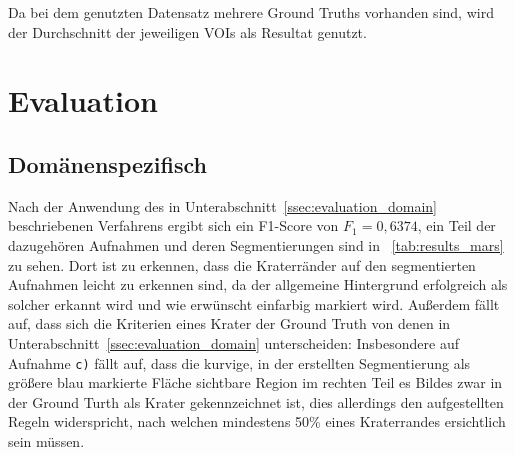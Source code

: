 Da bei dem genutzten Datensatz mehrere Ground Truths vorhanden sind, wird der Durchschnitt der jeweiligen VOIs als Resultat genutzt.



\section{Evaluation}
\label{sec:evaluation}

\subsection{Domänenspezifisch}
\label{ssec:results_domain}

Nach der Anwendung des in Unterabschnitt~\ref{ssec:evaluation_domain} beschriebenen Verfahrens ergibt sich ein F1-Score von $F_1=0,6374$, ein Teil der dazugehören Aufnahmen und deren Segmentierungen sind in \tablename~\ref{tab:results_mars} zu sehen.
Dort ist zu erkennen, dass die Kraterränder auf den segmentierten Aufnahmen leicht zu erkennen sind, da der allgemeine Hintergrund erfolgreich als solcher erkannt wird und wie erwünscht einfarbig markiert wird. Außerdem fällt auf, dass sich die Kriterien eines Krater der Ground Truth von denen in Unterabschnitt~\ref{ssec:evaluation_domain} unterscheiden: Insbesondere auf Aufnahme \texttt{c)} fällt auf, dass \bspw die kurvige, in der erstellten Segmentierung als größere blau markierte Fläche sichtbare Region im rechten Teil es Bildes zwar in der Ground Turth als Krater gekennzeichnet ist, dies allerdings den aufgestellten Regeln widerspricht, nach welchen mindestens 50\% eines Kraterrandes ersichtlich sein müssen.

